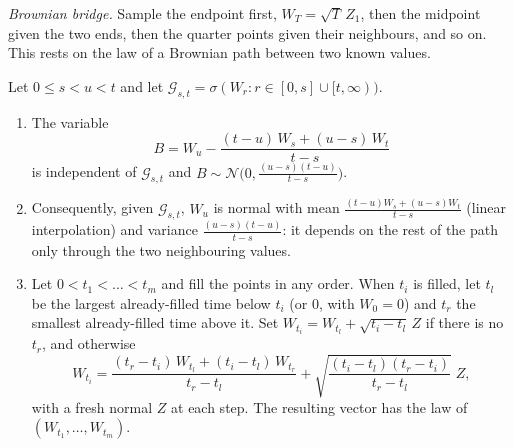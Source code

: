\emph{Brownian bridge.} Sample the endpoint first, $W_T=\sqrt T\,Z_1$, then the midpoint
given the two ends, then the quarter points given their neighbours, and so on. This rests
on the law of a Brownian path between two known values.

\begin{proposition}\label{prop:ps-bridge}
Let $0\le s<u<t$ and let $\mathcal G_{s,t}=\sigma(W_r:r\in[0,s]\cup[t,\infty))$.
\begin{enumerate}[label=(\roman*)]
  \item The variable
    \[
      B=W_u-\frac{(t-u)\,W_s+(u-s)\,W_t}{t-s}
    \]
    is independent of $\mathcal G_{s,t}$ and $B\sim\mathcal N\big(0,\frac{(u-s)(t-u)}{t-s}\big)$.
  \item Consequently, given $\mathcal G_{s,t}$, $W_u$ is normal with mean
    $\frac{(t-u)W_s+(u-s)W_t}{t-s}$ (linear interpolation) and variance
    $\frac{(u-s)(t-u)}{t-s}$: it depends on the rest of the path only through the two
    neighbouring values.
  \item Let $0<t_1<\dots<t_m$ and fill the points in any order. When $t_i$ is filled, let
    $t_l$ be the largest already-filled time below $t_i$ (or $0$, with $W_0=0$) and $t_r$
    the smallest already-filled time above it. Set
    $W_{t_i}=W_{t_l}+\sqrt{t_i-t_l}\,Z$ if there is no $t_r$, and otherwise
    \begin{equation}\label{eq:ps-bridge-step}
      W_{t_i}=\frac{(t_r-t_i)\,W_{t_l}+(t_i-t_l)\,W_{t_r}}{t_r-t_l}
      +\sqrt{\frac{(t_i-t_l)(t_r-t_i)}{t_r-t_l}}\;Z ,
    \end{equation}
    with a fresh normal $Z$ at each step. The resulting vector has the law of
    $(W_{t_1},\dots,W_{t_m})$.
\end{enumerate}
\end{proposition}

